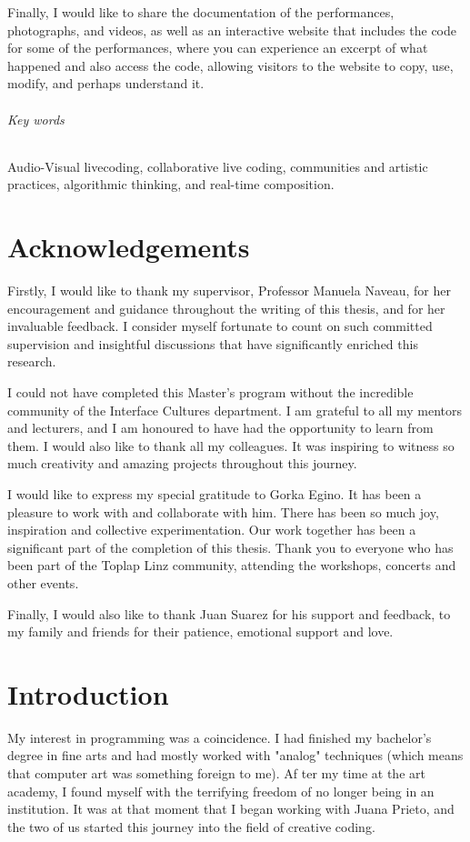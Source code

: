 \documentclass[12pt, twoside, a4paper]{report}
\begin{document}
Finally, I would like to share the documentation of the performances, photographs, and videos,
 as well as an interactive website that includes the code for some of the performances, 
 where you can experience an excerpt of what happened and also access the code, allowing visitors 
 to the website to copy, use, modify, and perhaps understand it.

\subparagraph{Key words} Audio-Visual livecoding, collaborative live coding, communities and artistic practices,
algorithmic thinking, and real-time composition.

\newpage

\chapter{Acknowledgements}

Firstly, I would like to thank my supervisor, Professor Manuela Naveau, for her encouragement and guidance throughout the writing of this thesis, and for her invaluable feedback.  I consider myself fortunate to count on such committed supervision and insightful discussions that have significantly enriched this research.

I could not have completed this Master's program without the incredible community of the Interface Cultures department. I am grateful to all my mentors and lecturers, and I am honoured to have had the opportunity to learn from them. I would also like to thank all my colleagues. It was inspiring to witness so much creativity and amazing projects throughout this journey. 

I would like to express my special gratitude to Gorka Egino. It has been a pleasure to work with and collaborate with him. There has been so much joy, inspiration and collective experimentation. Our work together has been a significant part of the completion of this thesis. Thank you to everyone who has been part of the Toplap Linz community, attending the workshops, concerts and other events.  

Finally, I would also like to thank Juan Suarez for his support and feedback, to my family and friends for their patience, emotional support and love.


\newpage

\chapter{Introduction}



My interest in programming was a coincidence. I had finished my bachelor's 
degree in fine arts and had mostly worked with "analog" techniques (which means that computer art was something foreign to me).
 Af  ter my time at the art academy, I found myself with the terrifying freedom of no longer being in an institution. 
 It was at that moment that I began working with Juana Prieto, and the two of us started 
 this journey into the field of creative coding.
\end{document}
